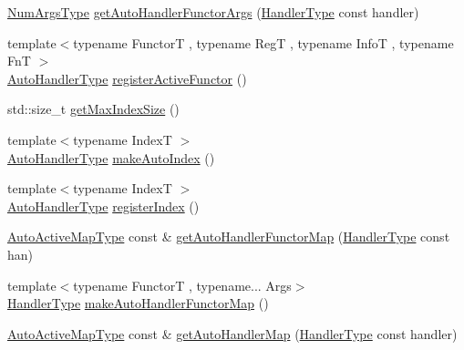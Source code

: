 \begin{DoxyCompactItemize}
\item 
\hyperlink{namespacevt_1_1auto__registry_aebda1d9d765bc9147dc654ad0712c936}{Num\+Args\+Type} \hyperlink{namespacevt_1_1auto__registry_a410be4f1a89d51d09a347c72d650ea8c}{get\+Auto\+Handler\+Functor\+Args} (\hyperlink{namespacevt_af64846b57dfcaf104da3ef6967917573}{Handler\+Type} const handler)
\item 
{\footnotesize template$<$typename FunctorT , typename RegT , typename InfoT , typename FnT $>$ }\\\hyperlink{namespacevt_1_1auto__registry_ae295e18699146815bb7d7674594d95d7}{Auto\+Handler\+Type} \hyperlink{namespacevt_1_1auto__registry_ab7e130e8790e4df4dc1d35476d1736e0}{register\+Active\+Functor} ()
\item 
std\+::size\+\_\+t \hyperlink{namespacevt_1_1auto__registry_a590741e9077c758629426d70ea37f4bf}{get\+Max\+Index\+Size} ()
\item 
{\footnotesize template$<$typename IndexT $>$ }\\\hyperlink{namespacevt_1_1auto__registry_ae295e18699146815bb7d7674594d95d7}{Auto\+Handler\+Type} \hyperlink{namespacevt_1_1auto__registry_a14e79eb6744c7f1584d46304356295e2}{make\+Auto\+Index} ()
\item 
{\footnotesize template$<$typename IndexT $>$ }\\\hyperlink{namespacevt_1_1auto__registry_ae295e18699146815bb7d7674594d95d7}{Auto\+Handler\+Type} \hyperlink{namespacevt_1_1auto__registry_a234dcadb35d20ff9a4d0e2464680aa36}{register\+Index} ()
\item 
\hyperlink{namespacevt_1_1auto__registry_ae1bc8f9afc86cc589761fbbf22064601}{Auto\+Active\+Map\+Type} const  \& \hyperlink{namespacevt_1_1auto__registry_ae33262fbb020ed50b79047d4ff7dd9cc}{get\+Auto\+Handler\+Functor\+Map} (\hyperlink{namespacevt_af64846b57dfcaf104da3ef6967917573}{Handler\+Type} const han)
\item 
{\footnotesize template$<$typename FunctorT , typename... Args$>$ }\\\hyperlink{namespacevt_af64846b57dfcaf104da3ef6967917573}{Handler\+Type} \hyperlink{namespacevt_1_1auto__registry_a64989cf40ed8fc5266f9eb67607f4842}{make\+Auto\+Handler\+Functor\+Map} ()
\item 
\hyperlink{namespacevt_1_1auto__registry_ae1bc8f9afc86cc589761fbbf22064601}{Auto\+Active\+Map\+Type} const  \& \hyperlink{namespacevt_1_1auto__registry_a66df7e6d0ce9044414cb82bbfe077e85}{get\+Auto\+Handler\+Map} (\hyperlink{namespacevt_af64846b57dfcaf104da3ef6967917573}{Handler\+Type} const handler)

\end{DoxyCompactItemize}
